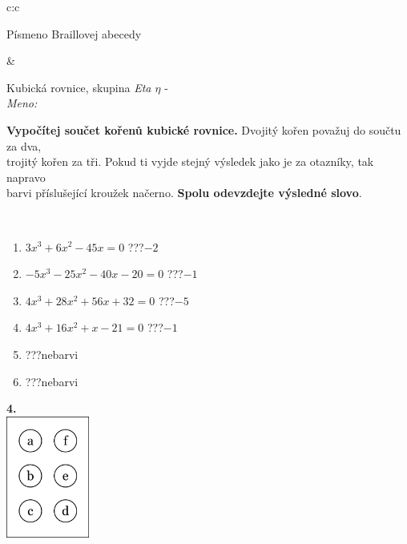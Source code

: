 \documentclass[10pt]{report}
\begin{document}
\begin{tabular}{c:c}
\begin{minipage}[c][104.5mm][t]{0.5\linewidth}
\begin{center}
\begin{minipage}{0.20\linewidth}
\begin{center}
{\small Písmeno Braillovej abecedy}
\end{center}
\end{minipage}
\end{center}
\end{minipage}
&
\begin{minipage}[c][104.5mm][t]{0.5\linewidth}
\begin{center}
\vspace{7mm}
{\huge Kubická rovnice, skupina \textit{Eta $\eta$} -}\\[5mm]
\textit{Meno:}\phantom{xxxxxxxxxxxxxxxxxxxxxxxxxxxxxxxxxxxxxxxxxxxxxxxxxxxxxxxxxxxxxxxxx}\\[5mm]
\begin{minipage}{0.95\linewidth}
\textbf{Vypočítej součet kořenů kubické rovnice.} Dvojitý kořen považuj do součtu za dva,\\trojitý kořen za tři. Pokud ti vyjde stejný výsledek jako je za otazníky, tak napravo\\barvi příslušející kroužek načerno. \textbf{Spolu odevzdejte výsledné slovo}.
\end{minipage}
\\[1mm]
\begin{minipage}{0.79\linewidth}
\begin{center}
\begin{varwidth}{\linewidth}
\begin{enumerate}
\Large
\item $3x^3+6x^2-45x=0$\quad \dotfill\; ???\;\dotfill \quad $-2$
\item $-5x^3-25x^2-40x-20=0$\quad \dotfill\; ???\;\dotfill \quad $-1$
\item $4x^3+28x^2+56x+32=0$\quad \dotfill\; ???\;\dotfill \quad $-5$
\item $4x^3+16x^2+x-21=0$\quad \dotfill\; ???\;\dotfill \quad $-1$
\item \quad \dotfill\; ???\;\dotfill \quad nebarvi
\item \quad \dotfill\; ???\;\dotfill \quad nebarvi
\end{enumerate}
\end{varwidth}
\end{center}
\end{minipage}
\begin{minipage}{0.20\linewidth}
\begin{center}
{\Huge\bfseries 4.} \\[2mm]
\includegraphics[height=40mm]{../images/braille.png}

\end{center}
\end{minipage}
\end{center}
\end{minipage}
\end{tabular}
\end{document}
